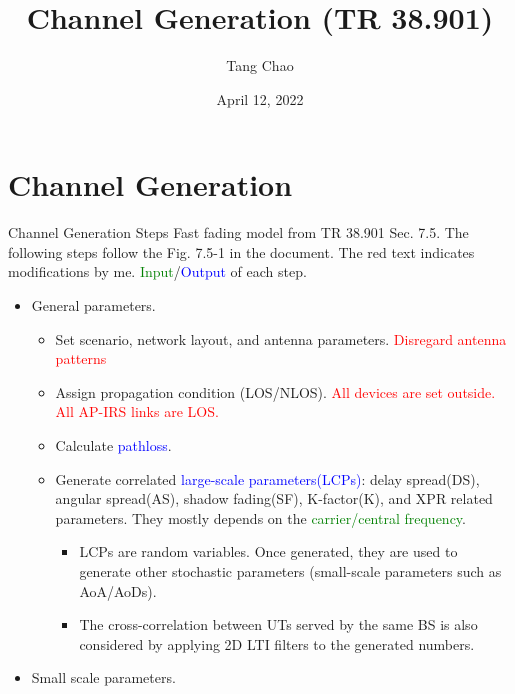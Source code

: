 \documentclass{beamer}
\title[NYCU]{Channel Generation (TR 38.901)}   %
\author{Tang Chao} %
\institute[] %
{
\textit{sisy710.ee04@g2.nctu.edu.tw} %
\\
\medskip
National Yang Ming Chiao Tung University\\ %
}
\date{April 12, 2022 } %
\begin{document}
\begin{frame}
\titlepage %
\end{frame}
\logo{}

\section{Channel Generation}
\begin{frame}[allowframebreaks]{Channel Generation Steps}
Fast fading model from TR 38.901 Sec. 7.5.  The following steps follow the Fig. 7.5-1 in the document. The red text indicates modifications by me. \textcolor{green}{Input}/\textcolor{blue}{Output} of each step.
\begin{itemize}
\item General parameters.
\begin{itemize}

    \item Set scenario, network layout, and antenna parameters. \textcolor{red}{Disregard antenna patterns}
    \item Assign propagation condition (LOS/NLOS). \textcolor{red}{All devices are set outside. All AP-IRS links are LOS.}
    \item Calculate \textcolor{blue}{pathloss}.
    \item Generate correlated \textcolor{blue}{large-scale parameters(LCPs)}: delay spread(DS), angular spread(AS), shadow fading(SF), K-factor(K), and XPR related parameters. They mostly depends on the \textcolor{green}{carrier/central frequency}.
    \begin{itemize}
        \item LCPs are random variables. Once generated, they are used to generate other stochastic parameters (small-scale parameters such as AoA/AoDs).
        \item The cross-correlation between UTs served by the same BS is also considered by applying 2D LTI filters to the generated numbers.
    \end{itemize}
\end{itemize}
\framebreak
\item Small scale parameters.
\begin{itemize}


\end{itemize}
\end{itemize}
\end{frame}
\end{document}
